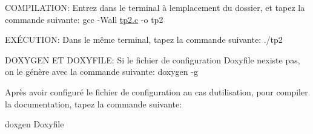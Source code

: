 COMPILATION\+: Entrez dans le terminal à l\textquotesingle{}emplacement du dossier, et tapez la commande suivante\+: gcc -\/Wall \mbox{\hyperlink{tp2_8c}{tp2.\+c}} -\/o tp2

EXÉ\+CUTION\+: Dans le même terminal, tapez la commande suivante\+: ./tp2

DOXYGEN ET DOXYFILE\+: Si le fichier de configuration Doxyfile n\textquotesingle{}existe pas, on le génère avec la commande suivante\+: doxygen -\/g

Après avoir configuré le fichier de configuration au cas d\textquotesingle{}utilisation, pour compiler la documentation, tapez la commande suivante\+: \begin{DoxyVerb}doxgen Doxyfile
\end{DoxyVerb}
 